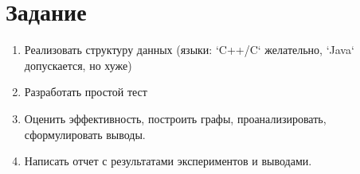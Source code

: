 \section{Задание}

\begin{enumerate}
    \item Реализовать структуру данных
    (языки: `C++/C` желательно, `Java` допускается, но хуже)
    \item Разработать простой тест
    \item Оценить эффективность, построить графы, проанализировать, сформулировать выводы.
    \item Написать отчет с результатами экспериментов и выводами.
\end{enumerate}
